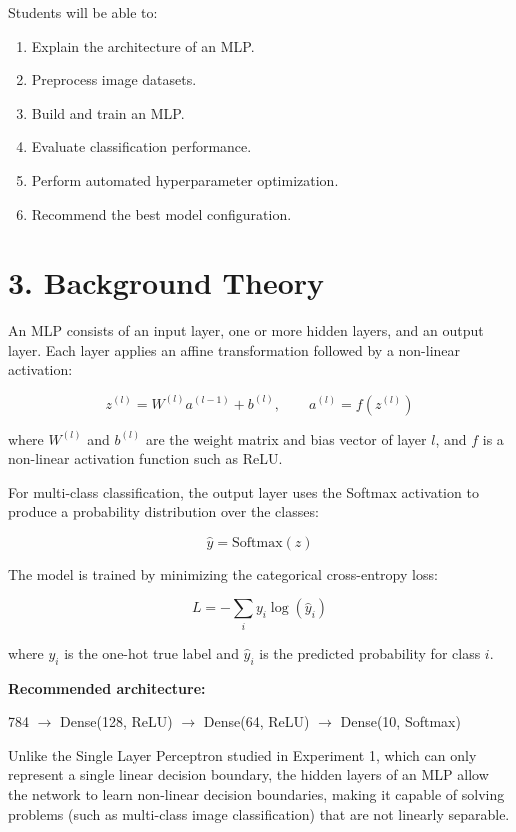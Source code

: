 \documentclass[11pt]{article}
\begin{document}
Students will be able to:
\begin{enumerate}[leftmargin=*]
\item Explain the architecture of an MLP.
\item Preprocess image datasets.
\item Build and train an MLP.
\item Evaluate classification performance.
\item Perform automated hyperparameter optimization.
\item Recommend the best model configuration.
\end{enumerate}


\section*{3. Background Theory}

An MLP consists of an input layer, one or more hidden layers, and an output layer. Each layer applies an affine transformation followed by a non-linear activation:

\[
z^{(l)} = W^{(l)} a^{(l-1)} + b^{(l)}, \qquad a^{(l)} = f\!\left(z^{(l)}\right)
\]

where $W^{(l)}$ and $b^{(l)}$ are the weight matrix and bias vector of layer $l$, and $f$ is a non-linear activation function such as ReLU.

For multi-class classification, the output layer uses the Softmax activation to produce a probability distribution over the classes:

\[
\hat y = \mathrm{Softmax}(z)
\]

The model is trained by minimizing the categorical cross-entropy loss:

\[
L = -\sum_i y_i \log(\hat y_i)
\]

where $y_i$ is the one-hot true label and $\hat y_i$ is the predicted probability for class $i$.

\textbf{Recommended architecture:}

\begin{center}
784 $\rightarrow$ Dense(128, ReLU) $\rightarrow$ Dense(64, ReLU) $\rightarrow$ Dense(10, Softmax)
\end{center}

Unlike the Single Layer Perceptron studied in Experiment 1, which can only represent a single linear decision boundary, the hidden layers of an MLP allow the network to learn non-linear decision boundaries, making it capable of solving problems (such as multi-class image classification) that are not linearly separable.
\end{document}
